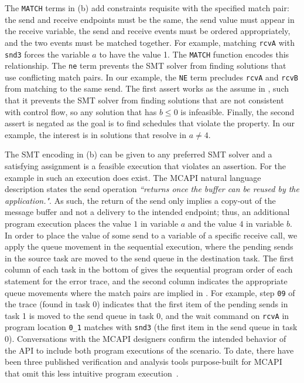 The \texttt{MATCH} terms in (b) add constraints
requisite with the specified match pair: the send and
receive endpoints must be the same, the send value must appear in the
receive variable, the send and receive events must be ordered
appropriately, and the two events must be matched together. For
example, matching \texttt{rcvA} with \texttt{snd3} forces the variable
$a$ to have the value 1. The \texttt{MATCH} function encodes this
relationship. The \texttt{ne} term prevents the SMT solver from
finding solutions that use conflicting match pairs. In our example,
the \texttt{NE} term precludes \texttt{rcvA} and \texttt{rcvB} from
matching to the same send. The first assert works as the assume in , such that it prevents the SMT solver from
finding solutions that are not consistent with control flow, so any
solution that has $b \leq 0$ is infeasible. Finally, the second assert is negated
as the goal is to find schedules that violate the property. In our
example, the interest is in solutions that resolve in $a \neq 4$.

The SMT encoding in (b) can be given to any preferred SMT
solver and a satisfying assignment is a feasible execution that violates an
assertion. For the example in  such an execution does exist.
The MCAPI natural language description states the send operation
\emph{``returns once the buffer can be reused by the application."}. As such,
the return of the send only implies a copy-out of the message buffer
and not a delivery to the intended endpoint; thus, an additional
program execution places the value $1$ in variable $a$ and the value
$4$ in variable $b$. In order to place the value of some send to a variable of a specific receive call, we apply the queue movement in the sequential execution, where the pending sends in the source task are moved to the send queue in the destination task. The first column of each task in the bottom
of  gives the sequential program order of each statement for the error trace, and the
second column indicates the appropriate queue movements where the match pairs are implied in . For example,
step \texttt{09} of the trace (found in task 0) indicates
that the first item of the pending sends in task 1 is moved to the send queue in task 0, and the wait command on \texttt{rcvA} in program location \texttt{0\_1} matches with \texttt{snd3} (the first item in the send queue in task 0).  Conversations with the
MCAPI designers confirm the intended behavior of the API to include
both program executions of the scenario. To date, there have been
three published verification and analysis tools purpose-built for
MCAPI that omit this less intuitive program
execution~\cite{sharma:fmcad09,elwakil:padtad10,elwakil:atva10}.


